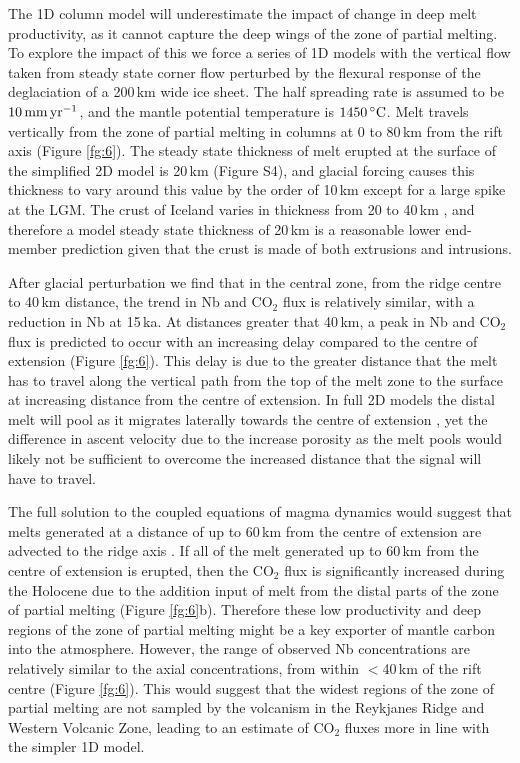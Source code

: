 \documentclass[draft,linenumbers]{agujournal2018}
\begin{document}
The 1D column model will underestimate the impact of change in deep melt productivity, as it cannot capture the deep wings of the zone of partial melting. To explore the impact of this we force a series of 1D models with the vertical flow taken from steady state corner flow perturbed by the flexural response of the deglaciation of a 200\,km wide ice sheet. The half spreading rate is assumed to be $10\rm\,mm\,yr^{-1}$, and the mantle potential temperature is $1450\rm\,^{\circ}C$. Melt travels vertically from the zone of partial melting in columns at 0 to 80\,km from the rift axis (Figure \ref{fg:6}). The steady state thickness of melt erupted at the surface of the simplified 2D model is 20\,km (Figure S4), and glacial forcing causes this thickness to vary around this value by the order of 10\,km except for a large spike at the LGM. The crust of Iceland varies in thickness from 20 to 40\,km \citep[e.g.][]{jenkins-etal-2018}, and therefore a model steady state thickness of 20\,km is a reasonable lower end-member prediction given that the crust is made of both extrusions and intrusions.

After glacial perturbation we find that in the central zone, from the ridge centre to 40\,km distance, the trend in Nb and CO$_{2}$ flux is relatively similar, with a reduction in Nb at 15\,ka. At distances greater that 40\,km, a peak in Nb and CO$_{2}$ flux is predicted to occur with an increasing delay compared to the centre of extension (Figure \ref{fg:6}). This delay is due to the greater distance that the melt has to travel along the vertical path from the top of the melt zone to the surface at increasing distance from the centre of extension. In full 2D models the distal melt will pool as it migrates laterally towards the centre of extension \citep{katz-2008}, yet the difference in ascent velocity due to the increase porosity as the melt pools would likely not be sufficient to overcome the increased distance that the signal will have to travel.

The full solution to the coupled equations of magma dynamics would suggest that melts generated at a distance of up to 60\,km from the centre of extension are advected to the ridge axis \citep{katz-2008}. If all of the melt generated up to 60\,km from the centre of extension is erupted, then the CO$_{2}$ flux is significantly increased during the Holocene due to the addition input of melt from the distal parts of the zone of partial melting (Figure \ref{fg:6}b). Therefore these low productivity and deep regions of the zone of partial melting might be a key exporter of mantle carbon into the atmosphere. However, the range of observed Nb concentrations are relatively similar to the axial concentrations, from within $<$40\,km of the rift centre (Figure \ref{fg:6}). This would suggest that the widest regions of the zone of partial melting are not sampled by the volcanism in the Reykjanes Ridge and Western Volcanic Zone, leading to an estimate of CO$_{2}$ fluxes more in line with the simpler 1D model.
\end{document}
